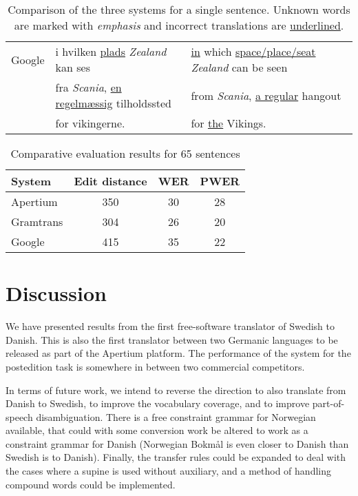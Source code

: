 \documentclass[11pt]{article}
\begin{document}
\begin{table*}
\begin{tabular}{|c|l|l|}
Google     & i hvilken \underline{plads} \emph{Zealand} kan ses           & \underline{in} which \underline{space/place/seat} \emph{Zealand} can be seen \\ 
~          & fra \emph{Scania}, \underline{en regelmæssig} tilholdssted   & from \emph{Scania}, \underline{a regular} hangout \\
~          & for vikingerne.                                  & for \underline{the} Vikings. \\
\hline 
\end{tabular}
 \caption{Comparison of the three systems for a single sentence. Unknown words are marked with \emph{emphasis} and
     incorrect translations are \underline{underlined}.}
 \label{table:extranslations}
\end{table*}

\begin{table}
\centering
\begin{tabular}{|l|c|c|c|}
\hline
System & Edit distance & WER & PWER\\
\hline
Apertium  & 350   & 30    & 28 \\
Gramtrans & 304   & 26    & 20 \\
Google    & 415   & 35    & 22 \\
\hline
\end{tabular}
    \caption{Comparative evaluation results for 65 sentences}
    \label{table:compeval}
\end{table}

\section{Discussion}

We have presented results from the first free-software translator of Swedish to Danish. This
is also the first translator between two Germanic languages to be released as part of the 
Apertium platform. The performance of the system for the postedition task is somewhere in between 
two commercial competitors. 

In terms of future work, we intend to reverse the direction to also translate from Danish to 
Swedish, to improve the vocabulary coverage, and to improve part-of-speech disambiguation. There
is a free constraint grammar for Norwegian \citep{hagen2000cbt} available, that could with some
conversion work be altered to work as a constraint grammar for Danish (Norwegian Bokmål is even
closer to Danish than Swedish is to Danish). Finally, the transfer rules could be expanded to 
deal with the cases where a supine is used without auxiliary, and a method of handling compound
words could be implemented.
\end{document}
